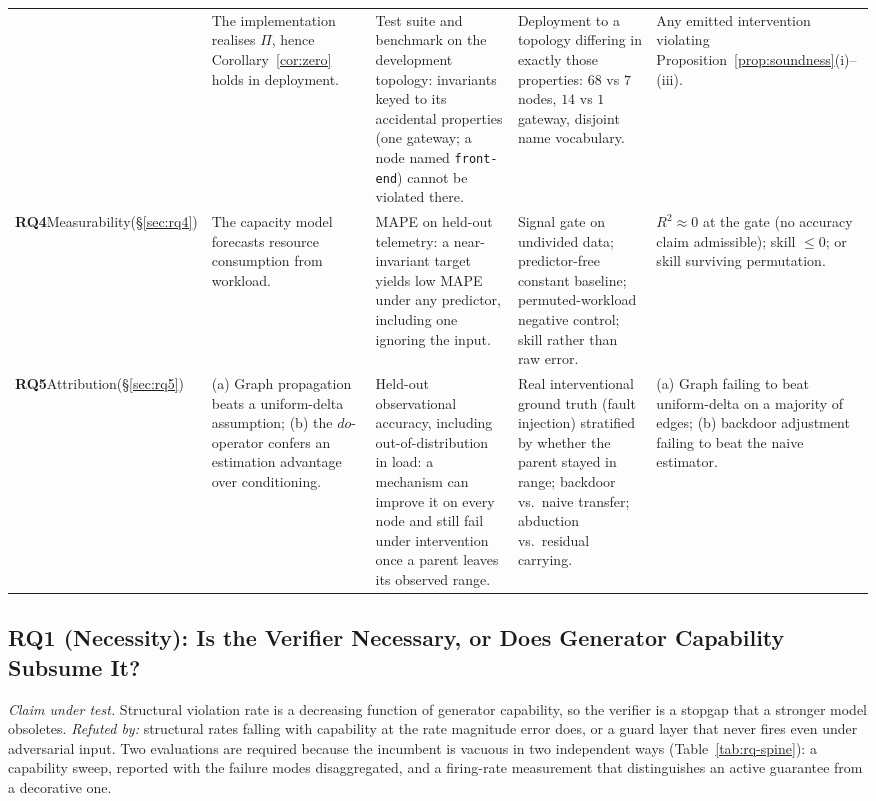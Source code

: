 \documentclass[journal, 10pt]{IEEEtran}
\begin{document}
\begin{table}[!t]
\begin{tabular}{p{1.5cm}p{3.2cm}p{4.2cm}p{3.9cm}p{3.5cm}}
& The implementation realises $\Pi$, hence Corollary~\ref{cor:zero} holds in deployment.
& Test suite and benchmark on the development topology: invariants keyed to its accidental properties (one gateway; a node named \texttt{front-end}) cannot be violated there.
& Deployment to a topology differing in exactly those properties: $68$ vs $7$ nodes, $14$ vs $1$ gateway, disjoint name vocabulary.
& Any emitted intervention violating Proposition~\ref{prop:soundness}(i)--(iii). \\
\addlinespace
\textbf{RQ4}\newline Measurability\newline (\S\ref{sec:rq4})
& The capacity model forecasts resource consumption from workload.
& MAPE on held-out telemetry: a near-invariant target yields low MAPE under any predictor, including one ignoring the input.
& Signal gate on undivided data; predictor-free constant baseline; permuted-workload negative control; skill rather than raw error.
& $R^2\!\approx\!0$ at the gate (no accuracy claim admissible); skill $\leq 0$; or skill surviving permutation. \\
\addlinespace
\textbf{RQ5}\newline Attribution\newline (\S\ref{sec:rq5})
& (a) Graph propagation beats a uniform-delta assumption; (b) the $do$-operator confers an estimation advantage over conditioning.
& Held-out observational accuracy, including out-of-distribution in load: a mechanism can improve it on every node and still fail under intervention once a parent leaves its observed range.
& Real interventional ground truth (fault injection) stratified by whether the parent stayed in range; backdoor vs.\ naive transfer; abduction vs.\ residual carrying.
& (a) Graph failing to beat uniform-delta on a majority of edges; (b) backdoor adjustment failing to beat the naive estimator. \\
\bottomrule
\end{tabular}
\end{table}

\subsection{RQ1 (Necessity): Is the Verifier Necessary, or Does Generator Capability Subsume It?}
\label{sec:rq1}

\emph{Claim under test.} Structural violation rate is a decreasing function of
generator capability, so the verifier is a stopgap that a stronger model
obsoletes. \emph{Refuted by:} structural rates falling with capability at the
rate magnitude error does, or a guard layer that never fires even under
adversarial input. Two evaluations are required because the incumbent is vacuous
in two independent ways (Table~\ref{tab:rq-spine}): a capability sweep, reported
with the failure modes disaggregated, and a firing-rate measurement that
distinguishes an active guarantee from a decorative one.
\end{document}
